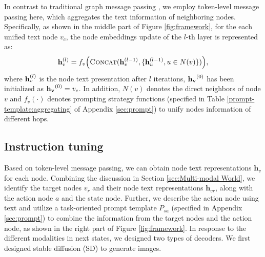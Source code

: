 In contrast to traditional graph message passing \citep{kipf2016semi,hamilton2017inductive,velivckovic2017graph}, we employ token-level message passing here, which aggregates the text information of neighboring nodes. Specifically, as shown in the middle part of Figure \ref{fig:framework}, for the each unified text node $v_c$, the node embeddings update of the $l$-th layer is represented as: 
\vspace{-3.5mm}
\begin{equation}
    \label{eq:sage}
    \mathbf{h}_v^{(l)} =f_{v}\Big(\textsc{Concat}(\mathbf{h}_v^{(l-1)},\{\mathbf{h}_u^{(l-1)}, u \in {N}(v) \})\Big),
\end{equation}
where $\mathbf{h}_v^{(l)}$ is the node text presentation after $l$ iterations, $\mathbf{h_v}^{(0)}$ has been initialized as $\mathbf{h_v}^{(0)}=v_c$. In addition, ${N}(v)$ denotes the direct neighbors of node $v$ and $f_{v}(\cdot)$ denotes prompting strategy functions (specified in Table \ref{prompt-template:aggregating} of Appendix \ref{sec:prompt}) to unify nodes information of different hops. 




\subsection{Instruction tuning} \label{sec:Instruction tuning}  Based on token-level message passing, we can obtain node text representations $\mathbf{h}_v$ for each node. Combining the discussion in Section \ref{sec:Multi-modal World}, we identify the target nodes $v_r$ and their node text representations $\mathbf{h}_{vr}$, along with the action node $a$ and the state node. Further, we describe the action node using text and utilize a task-oriented prompt template $P_{sa}$ (specified in Appendix \ref{sec:prompt}) to combine the information from the target nodes and the action node, as shown in the right part of Figure \ref{fig:framework}.  In response to the different modalities in next states, we designed two types of decoders. We first designed stable diffusion (SD) to generate images.

